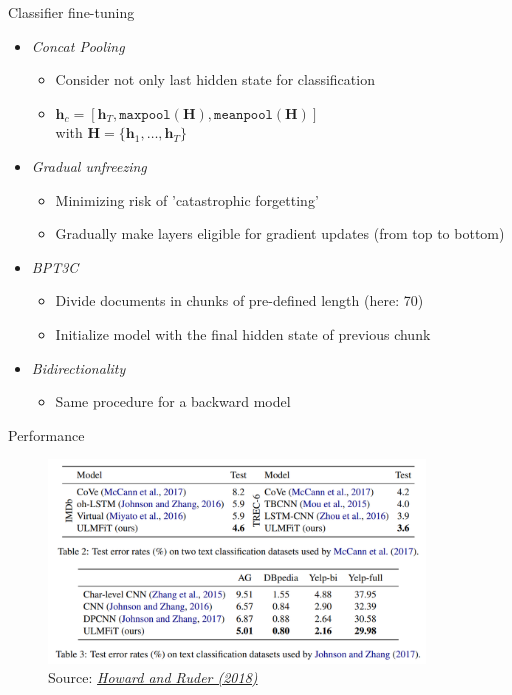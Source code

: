 
\begin{vbframe}{Classifier fine-tuning}

\vfill

\begin{itemize}
	\item \textit{Concat Pooling}
		\begin{itemize}
			\item Consider not only last hidden state for classification
			\item $\textbf{h}_c = [\textbf{h}_T, \texttt{maxpool}(\textbf{H}), \texttt{meanpool}(\textbf{H})]$ \\
						with $\textbf{H} = \{\textbf{h}_1, \hdots, \textbf{h}_T\}$
		\end{itemize}
	\item \textit{Gradual unfreezing}
		\begin{itemize}
			\item Minimizing risk of 'catastrophic forgetting'
			\item Gradually make layers eligible for gradient updates (from top to bottom)
		\end{itemize}
	\item \textit{BPT3C}
		\begin{itemize}
			\item Divide documents in chunks of pre-defined length (here: 70)
			\item Initialize model with the final hidden state of previous chunk
		\end{itemize}
	\item \textit{Bidirectionality}
		\begin{itemize}
			\item Same procedure for a backward model
		\end{itemize}
\end{itemize}

\vfill

\end{vbframe}


\begin{vbframe}{Performance}

\vfill
			
	\begin{figure}
		\centering
		\includegraphics[width = 10cm]{figure/ulmfit-sota.png}\\ 
		\footnotesize{Source:} \href{https://arxiv.org/pdf/1801.06146.pdf}{\footnotesize \it Howard and Ruder (2018)}
	\end{figure}

\vfill

\end{vbframe}

\endlecture


